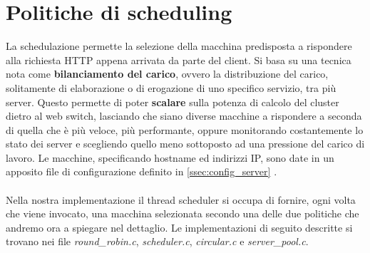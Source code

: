 \documentclass[italian]{tktltiki2}
\begin{document}
\section{Politiche di scheduling}
 \label{sec: sched_p}
La schedulazione permette la selezione della macchina predisposta a rispondere alla richiesta HTTP appena arrivata da parte del client. Si basa su una tecnica nota come \textbf{bilanciamento del carico}, ovvero la distribuzione del carico, solitamente di elaborazione o di erogazione di uno specifico servizio, tra più server. Questo permette di poter \textbf{scalare} sulla potenza di calcolo del cluster dietro al web switch, lasciando che siano diverse macchine a rispondere a seconda di quella che è più veloce, più performante, oppure monitorando costantemente lo stato dei server e scegliendo quello meno sottoposto ad una pressione del carico di lavoro. Le macchine, specificando hostname ed indirizzi IP, sono date in un apposito file di configurazione definito in \ref{ssec:config_server} .
\\
\\
Nella nostra implementazione il thread scheduler si occupa di fornire,  ogni volta che viene invocato, una macchina selezionata secondo una delle due politiche che andremo ora a spiegare nel dettaglio. Le implementazioni di seguito descritte si trovano nei file \emph{round\_robin.c}, \emph{scheduler.c}, \emph{circular.c} e  \emph{server\_pool.c}. 
\end{document}

